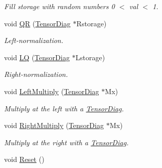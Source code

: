 \begin{DoxyCompactItemize}
\begin{DoxyCompactList}\small\item\em Fill storage with random numbers 0 $<$ val $<$ 1. \end{DoxyCompactList}\item 
void \hyperlink{classCheMPS2_1_1TensorT_af21d5300f20c3baf88edf9ec3d3bd943}{Q\-R} (\hyperlink{classCheMPS2_1_1TensorDiag}{Tensor\-Diag} $\ast$Rstorage)
\begin{DoxyCompactList}\small\item\em Left-\/normalization. \end{DoxyCompactList}\item 
void \hyperlink{classCheMPS2_1_1TensorT_afea87f0a1be6ed05fb668528f2f8bf30}{L\-Q} (\hyperlink{classCheMPS2_1_1TensorDiag}{Tensor\-Diag} $\ast$Lstorage)
\begin{DoxyCompactList}\small\item\em Right-\/normalization. \end{DoxyCompactList}\item 
void \hyperlink{classCheMPS2_1_1TensorT_a6048e242ad6c3b1798ead44f7256fe31}{Left\-Multiply} (\hyperlink{classCheMPS2_1_1TensorDiag}{Tensor\-Diag} $\ast$Mx)
\begin{DoxyCompactList}\small\item\em Multiply at the left with a \hyperlink{classCheMPS2_1_1TensorDiag}{Tensor\-Diag}. \end{DoxyCompactList}\item 
void \hyperlink{classCheMPS2_1_1TensorT_ad53db81f1f1bf33512f93a23abc0ed50}{Right\-Multiply} (\hyperlink{classCheMPS2_1_1TensorDiag}{Tensor\-Diag} $\ast$Mx)
\begin{DoxyCompactList}\small\item\em Multiply at the right with a \hyperlink{classCheMPS2_1_1TensorDiag}{Tensor\-Diag}. \end{DoxyCompactList}\item 
\hypertarget{classCheMPS2_1_1TensorT_a1f0830b0e729573fe19a3327462f7e7e}{void \hyperlink{classCheMPS2_1_1TensorT_a1f0830b0e729573fe19a3327462f7e7e}{Reset} ()}\label{classCheMPS2_1_1TensorT_a1f0830b0e729573fe19a3327462f7e7e}


\end{DoxyCompactItemize}
